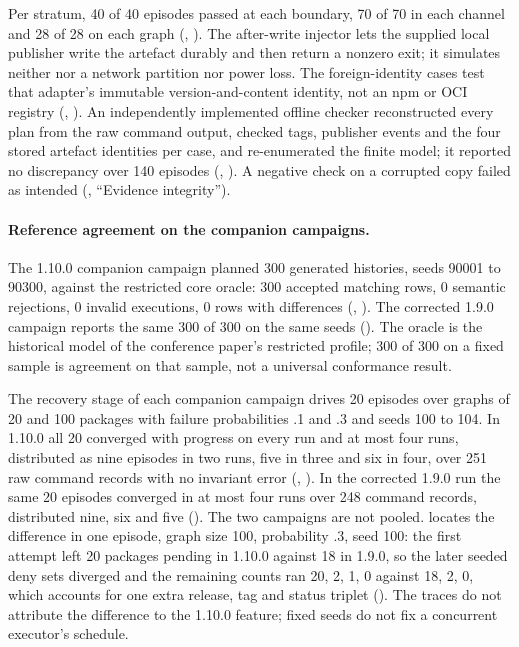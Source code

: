 Per stratum, 40 of 40 episodes passed at each boundary, 70 of 70 in each
channel and 28 of 28 on each graph (, ). The
after-write injector lets the supplied local publisher write the artefact
durably and then return a nonzero exit; it simulates neither 
nor a network partition nor power loss. The foreign-identity cases test that
adapter's immutable version-and-content identity, not an npm or OCI registry
(, ). An independently implemented
offline checker reconstructed every plan from the raw command output, checked
tags, publisher events and the four stored artefact identities per case, and
re-enumerated the finite model; it reported no discrepancy over 140 episodes
(, ). A negative check
on a corrupted copy failed as intended (, ``Evidence
integrity'').

\paragraph{Reference agreement on the companion campaigns.}
The 1.10.0 companion campaign planned 300 generated histories, seeds 90001 to
90300, against the restricted core oracle: 300 accepted matching rows, 0
semantic rejections, 0 invalid executions, 0 rows with differences
(,
). The corrected 1.9.0 campaign reports the same 300 of 300 on the
same seeds (). The
oracle is the historical model of the conference paper's restricted profile;
300 of 300 on a fixed sample is agreement on that sample, not a universal
conformance result.

The recovery stage of each companion campaign drives 20 episodes over graphs
of 20 and 100 packages with failure probabilities .1 and .3 and seeds 100 to
104. In 1.10.0 all 20 converged with progress on every run and at most four
runs, distributed as nine episodes in two runs, five in three and six in four,
over 251 raw command records with no invariant error (,
). In the corrected 1.9.0 run the same 20 episodes converged in
at most four runs over 248 command records, distributed nine, six and five
(). The two campaigns are not pooled.
 locates
the difference in one episode, graph size 100, probability .3, seed 100: the
first attempt left 20 packages pending in 1.10.0 against 18 in 1.9.0, so the
later seeded deny sets diverged and the remaining counts ran 20, 2, 1, 0
against 18, 2, 0, which accounts for one extra release, tag and status
triplet (). The traces do not attribute
the difference to the 1.10.0 feature; fixed seeds do not fix a concurrent
executor's schedule.

